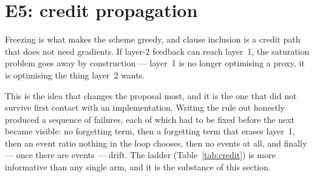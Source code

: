 \section{E5: credit propagation}
\label{sec:credit}

 Freezing is what makes the scheme greedy, and clause inclusion is a
credit path that does not need gradients. If layer-2 feedback can reach layer~1, the
saturation problem goes away by construction --- layer~1 is no longer optimising a proxy, it
is optimising the thing layer~2 wants.

This is the idea that changes the proposal most, and it is the one that did not survive first
contact with an implementation. Writing the rule out honestly produced a sequence of failures,
each of which had to be fixed before the next became visible: no forgetting term, then a
forgetting term that erases layer~1, then an event ratio nothing in the loop chooses, then no
events at all, and finally --- once there are events --- drift. The ladder
(Table~\ref{tab:credit}) is more informative than any single arm, and it is the substance of
this section.

\begin{table}[h]
\centering\small
\caption{The credit ladder.  is the fraction of credit events actually applied,
 the number of frozen-layer-1 epochs before the credit path is switched on,
/ the feedback events actually delivered to layer~1 over the whole run, and
/ layer~1's median clause size and firing rate at the end. 
is the best test accuracy over epochs, as everywhere else in this report;  is the
accuracy at the last epoch, and the two differ here because several of these arms do not
converge --- they collapse, and the best epoch is an early one.}
\label{tab:credit}
\end{table}

